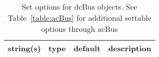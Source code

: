 \begin{table}[ht]
\centering
\begin{tabular}{p{5cm} c c p{7cm}}
\hline
string(s) & type & default & description \\
\hline
\hline
\end{tabular}
\caption{Set options for dcBus objects. See Table~\ref{table:acBus} for additional settable options through acBus}
\label{table:dcBus}
\end{table}
